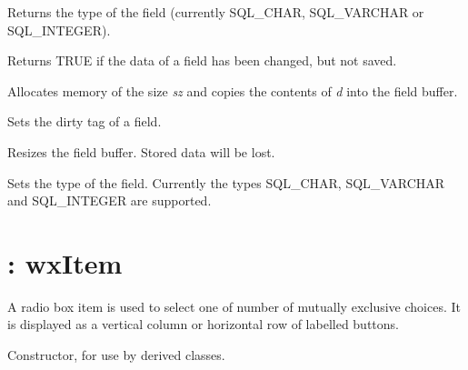 Returns the type of the field (currently SQL\_CHAR, SQL\_VARCHAR or SQL\_INTEGER).
 


Returns TRUE if the data of a field has been changed, but not saved.



Allocates memory of the size {\it sz} and copies the contents of {\it d} into the
field buffer.
  


Sets the dirty tag of a field.



Resizes the field buffer. Stored data will be lost.
  


Sets the type of the field. Currently the types SQL\_CHAR, SQL\_VARCHAR and
SQL\_INTEGER are supported.


\section{: wxItem}\label{wxradiobox}

A radio box item is used to select one of number of mutually exclusive
choices.  It is displayed as a vertical column or horizontal row of
labelled buttons.

\label{constrradiobox}


Constructor, for use by derived classes.


